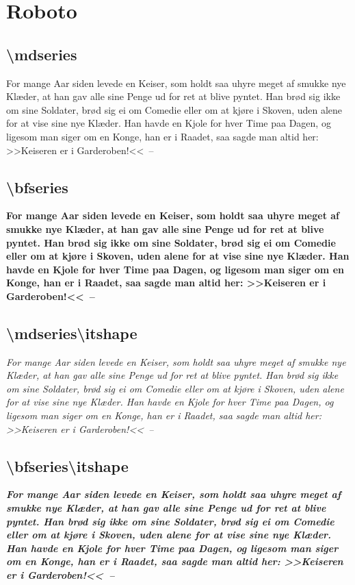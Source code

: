 \documentclass[danish,a4paper,11pt]{scrartcl}
\begin{document}
\section*{Roboto}
\subsection*{\textbackslash mdseries}
\normalfont\mdseries
  For mange Aar siden levede en Keiser, som holdt saa uhyre meget af
   smukke nye Kl\ae der, at han gav alle sine Penge ud for ret at blive
   pyntet. Han br\o d sig ikke om sine Soldater, br\o d sig ei om
   Comedie eller om at kj\o re i Skoven, uden alene for at vise sine
   nye Kl\ae der. Han havde en Kjole for hver Time paa Dagen, og
   ligesom man siger om en Konge, han er i Raadet, saa sagde man altid
   her: >>Keiseren er i Garderoben!<<~--

\subsection*{\textbackslash bfseries}
\normalfont\bfseries
  For mange Aar siden levede en Keiser, som holdt saa uhyre meget af
   smukke nye Kl\ae der, at han gav alle sine Penge ud for ret at blive
   pyntet. Han br\o d sig ikke om sine Soldater, br\o d sig ei om
   Comedie eller om at kj\o re i Skoven, uden alene for at vise sine
   nye Kl\ae der. Han havde en Kjole for hver Time paa Dagen, og
   ligesom man siger om en Konge, han er i Raadet, saa sagde man altid
   her: >>Keiseren er i Garderoben!<<~--

\subsection*{\textbackslash mdseries\textbackslash itshape}
\normalfont\mdseries\itshape
  For mange Aar siden levede en Keiser, som holdt saa uhyre meget af
   smukke nye Kl\ae der, at han gav alle sine Penge ud for ret at blive
   pyntet. Han br\o d sig ikke om sine Soldater, br\o d sig ei om
   Comedie eller om at kj\o re i Skoven, uden alene for at vise sine
   nye Kl\ae der. Han havde en Kjole for hver Time paa Dagen, og
   ligesom man siger om en Konge, han er i Raadet, saa sagde man altid
   her: >>Keiseren er i Garderoben!<<~--

\subsection*{\textbackslash bfseries\textbackslash itshape}
\normalfont\bfseries\itshape
  For mange Aar siden levede en Keiser, som holdt saa uhyre meget af
   smukke nye Kl\ae der, at han gav alle sine Penge ud for ret at blive
   pyntet. Han br\o d sig ikke om sine Soldater, br\o d sig ei om
   Comedie eller om at kj\o re i Skoven, uden alene for at vise sine
   nye Kl\ae der. Han havde en Kjole for hver Time paa Dagen, og
   ligesom man siger om en Konge, han er i Raadet, saa sagde man altid
   her: >>Keiseren er i Garderoben!<<~--
\end{document}
